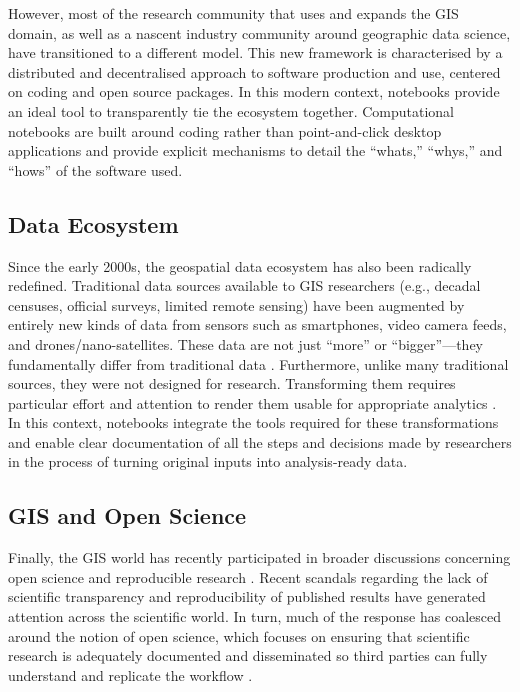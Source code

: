 \documentclass[11pt,letterpaper]{article}
\begin{document}
However, most of the research community that uses and expands the GIS domain, as well as a nascent industry community around geographic data science, have transitioned to a different model. This new framework is characterised by a distributed and decentralised approach to software production and use, centered on coding and open source packages. In this modern context, notebooks provide an ideal tool to transparently tie the ecosystem together. Computational notebooks are built around coding rather than point-and-click desktop applications and provide explicit mechanisms to detail the \enquote{whats,} \enquote{whys,} and \enquote{hows} of the software used.

\subsection{Data Ecosystem}

Since the early 2000s, the geospatial data ecosystem has also been radically redefined. Traditional data sources available to GIS researchers (e.g., decadal censuses, official surveys, limited remote sensing) have been augmented by entirely new kinds of data from sensors such as smartphones, video camera feeds, and drones/nano-satellites. These data are not just \enquote{more} or \enquote{bigger}---they fundamentally differ from traditional data \citep{kitchin_what_2016}. Furthermore, unlike many traditional sources, they were not designed for research. Transforming them requires particular effort and attention to render them usable for appropriate analytics \citep{harris_more_2017,singleton_geographic_2019}. In this context, notebooks integrate the tools required for these transformations and enable clear documentation of all the steps and decisions made by researchers in the process of turning original inputs into analysis-ready data.

\subsection{GIS and Open Science}

Finally, the GIS world has recently participated in broader discussions concerning open science and reproducible research \citep{brunsdon_quantitative_2016,kedron_reproducibility_2019}. Recent scandals regarding the lack of scientific transparency and reproducibility of published results have generated attention across the scientific world. In turn, much of the response has coalesced around the notion of open science, which focuses on ensuring that scientific research is adequately documented and disseminated so third parties can fully understand and replicate the workflow \citep{koster_fueling_2020,poorthuis_being_2019,rey_show_2009}.
\end{document}
